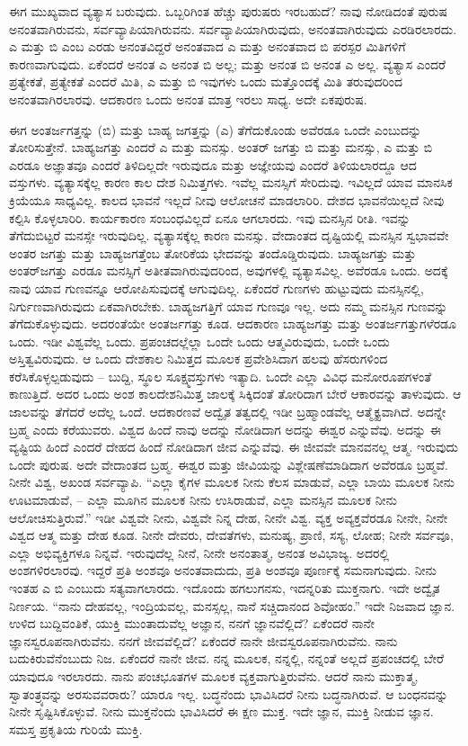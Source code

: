 ಈಗ ಮುಖ್ಯವಾದ ವ್ಯತ್ಯಾಸ ಬರುವುದು. ಒಬ್ಬರಿಗಿಂತ ಹೆಚ್ಚು ಪುರುಷರು ಇರಬಹುದೆ? ನಾವು ನೋಡಿದಂತೆ ಪುರುಷ ಅನಂತವಾಗಿರುವನು, ಸರ್ವವ್ಯಾಪಿಯಾಗಿರುವನು. ಸರ್ವವ್ಯಾಪಿಯಾಗಿರುವುದು, ಅನಂತವಾಗಿರುವುದು ಎರಡಿರಲಾರದು. ಎ ಮತ್ತು ಬಿ ಎಂಬ ಎರಡು ಅನಂತವಿದ್ದರೆ ಅನಂತವಾದ ಎ ಮತ್ತು ಅನಂತವಾದ ಬಿ ಪರಸ್ಪರ ಮಿತಿಗಳಿಗೆ ಕಾರಣವಾಗುವುದು. ಏಕೆಂದರೆ ಅನಂತ ಎ ಅನಂತ ಬಿ ಅಲ್ಲ; ಮತ್ತು ಅನಂತ ಬಿ ಅನಂತ ಎ ಅಲ್ಲ. ವ್ಯತ್ಯಾಸ ಎಂದರೆ ಪ್ರತ್ಯೇಕತೆ, ಪ್ರತ್ಯೇಕತೆ ಎಂದರೆ ಮಿತಿ, ಎ ಮತ್ತು ಬಿ ಇವುಗಳು ಒಂದು ಮತ್ತೊಂದಕ್ಕೆ ಮಿತಿ ತರುವುದರಿಂದ ಅನಂತವಾಗಿರಲಾರವು. ಆದಕಾರಣ ಒಂದು ಅನಂತ ಮಾತ್ರ ಇರಲು ಸಾಧ್ಯ. ಅದೇ ಏಕಪುರುಷ.

ಈಗ ಅಂತರ್ಜಗತ್ತನ್ನು (ಬಿ) ಮತ್ತು ಬಾಹ್ಯ ಜಗತ್ತನ್ನು (ಎ) ತೆಗೆದುಕೊಂಡು ಅವೆರಡೂ ಒಂದೇ ಎಂಬುದನ್ನು ತೋರಿಸುತ್ತೇನೆ. ಬಾಹ್ಯಜಗತ್ತು ಎಂದರೆ ಎ ಮತ್ತು ಮನಸ್ಸು. ಅಂತರ್‌ ಜಗತ್ತು ಬಿ ಮತ್ತು ಮನಸ್ಸು, ಎ ಮತ್ತು ಬಿ ಎರಡೂ ಅಜ್ಞಾತವೂ ಎಂದರೆ ತಿಳಿದಿಲ್ಲದೇ ಇರುವುದೂ ಮತ್ತು ಅಜ್ಞೇಯವು ಎಂದರೆ ತಿಳಿಯಲಾರದ್ದೂ ಆದ ವಸ್ತುಗಳು. ವ್ಯತ್ಯಾಸಕ್ಕೆಲ್ಲ ಕಾರಣ ಕಾಲ ದೇಶ ನಿಮಿತ್ತಗಳು. ಇವೆಲ್ಲ ಮನಸ್ಸಿಗೆ ಸೇರಿದುವು. ಇವಿಲ್ಲದೆ ಯಾವ ಮಾನಸಿಕ ಕ್ರಿಯೆಯೂ ಸಾಧ್ಯವಿಲ್ಲ. ಕಾಲದ ಭಾವನೆ ಇಲ್ಲದೆ ನೀವು ಆಲೋಚನೆ ಮಾಡಲಾರಿರಿ. ದೇಶದ ಭಾವನೆಯಿಲ್ಲದೆ ನೀವು ಕಲ್ಪಿಸಿ ಕೊಳ್ಳಲಾರಿರಿ. ಕಾರ್ಯಕಾರಣ ಸಂಬಂಧವಿಲ್ಲದೆ ಏನೂ ಆಗಲಾರದು. ಇವು ಮನಸ್ಸಿನ ರೀತಿ. ಇವನ್ನು ತೆಗೆದುಬಿಟ್ಟರೆ ಮನಸ್ಸೇ ಇರುವುದಿಲ್ಲ. ವ್ಯತ್ಯಾಸಕ್ಕೆಲ್ಲ ಕಾರಣ ಮನಸ್ಸು. ವೇದಾಂತದ ದೃಷ್ಟಿಯಲ್ಲಿ ಮನಸ್ಸಿನ ಸ್ವಭಾವವೇ ಅಂತರ ಜಗತ್ತು ಮತ್ತು ಬಾಹ್ಯಜಗತ್ತೆಂಬ ತೋರಿಕೆಯ ಭೇದವನ್ನು ತಂದೊಡ್ಡಿರುವುದು. ಬಾಹ್ಯಜಗತ್ತು ಮತ್ತು ಅಂತರ್‌ಜಗತ್ತು ಎರಡೂ ಮನಸ್ಸಿಗೆ ಅತೀತವಾಗಿರುವುದರಿಂದ, ಅವುಗಳಲ್ಲಿ ವ್ಯತ್ಯಾಸವಿಲ್ಲ. ಅವೆರಡೂ ಒಂದು. ಅದಕ್ಕೆ ನಾವು ಯಾವ ಗುಣವನ್ನೂ ಆರೋಪಿಸುವುದಕ್ಕೆ ಆಗುವುದಿಲ್ಲ. ಏಕೆಂದರೆ ಗುಣಗಳು ಹುಟ್ಟುವುದು ಮನಸ್ಸಿನಲ್ಲಿ, ನಿರ್ಗುಣವಾಗಿರುವುದು ಏಕವಾಗಿರಬೇಕು. ಬಾಹ್ಯಜಗತ್ತಿಗೆ ಯಾವ ಗುಣವೂ ಇಲ್ಲ. ಅದು ನಮ್ಮ ಮನಸ್ಸಿನ ಗುಣವನ್ನು ತೆಗೆದುಕೊಳ್ಳುವುದು. ಅದರಂತೆಯೇ ಅಂತರ್ಜಗತ್ತು ಕೂಡ. ಆದಕಾರಣ ಬಾಹ್ಯಜಗತ್ತು ಮತ್ತು ಅಂತರ್ಜಗತ್ತುಗಳೆರಡೂ ಒಂದು. ಇಡೀ ವಿಶ್ವವೆಲ್ಲ ಒಂದು. ಪ್ರಪಂಚದಲ್ಲೆಲ್ಲಾ ಒಂದೇ ಒಂದು ಆತ್ಮವಿರುವುದು, ಒಂದೇ ಒಂದು ಅಸ್ತಿತ್ವವಿರುವುದು. ಆ ಒಂದು ದೇಶಕಾಲ ನಿಮಿತ್ತದ ಮೂಲಕ ಪ್ರವೇಶಿಸಿದಾಗ ಹಲವು ಹೆಸರುಗಳಿಂದ ಕರೆಸಿಕೊಳ್ಳಲ್ಪಡುವುದು – ಬುದ್ದಿ, ಸ್ಥೂಲ ಸೂಕ್ಷ್ಮವಸ್ತುಗಳು ಇತ್ಯಾದಿ. ಒಂದೇ ಎಲ್ಲಾ ವಿವಿಧ ಮನೋರೂಪಗಳಂತೆ ಕಾಣುತ್ತಿದೆ. ಅದರ ಒಂದು ಅಂಶ ಕಾಲದೇಶನಿಮಿತ್ತ ಜಾಲಕ್ಕೆ ಸಿಕ್ಕಿದಂತೆ ತೋರಿದಾಗ ಬೇರೆ ಆಕಾರವನ್ನು ತಾಳುವುದು. ಆ ಜಾಲವನ್ನು ತೆಗೆದರೆ ಅದೆಲ್ಲ ಒಂದೆ. ಆದಕಾರಣವೆ ಅದ್ವೈತ ತತ್ವದಲ್ಲಿ ಇಡೀ ಬ್ರಹ್ಮಾಂಡವೆಲ್ಲ ಆತ್ಮೈಕ್ಯವಾಗಿದೆ. ಅದನ್ನೇ ಬ್ರಹ್ಮ ಎಂದು ಕರೆಯುವರು. ವಿಶ್ವದ ಹಿಂದೆ ನಾವು ಅದನ್ನು ನೋಡಿದಾಗ ಅದನ್ನು ಈಶ್ವರ ಎನ್ನುವೆವು. ಅದನ್ನು ಈ ವ್ಯಷ್ಟಿಯ ಹಿಂದೆ ಎಂದರೆ ದೇಹದ ಹಿಂದೆ ನೋಡಿದಾಗ ಜೀವ ಎನ್ನುವೆವು. ಈ ಜೀವವೇ ಮಾನವನಲ್ಲ ಆತ್ಮ. ಇರುವುದು ಒಂದೇ ಪುರುಷ. ಅದೇ ವೇದಾಂತದ ಬ್ರಹ್ಮ. ಈಶ್ವರ ಮತ್ತು ಜೀವಿಯನ್ನು ವಿಶ್ಲೇಷಣೆಮಾಡಿದಾಗ ಅವೆರಡೂ ಬ್ರಹ್ಮವೆ. ನೀನೇ ವಿಶ್ವ, ಅಖಂಡ ಸರ್ವವ್ಯಾಪಿ. “ಎಲ್ಲಾ ಕೈಗಳ ಮೂಲಕ ನೀನು ಕೆಲಸ ಮಾಡುವೆ, ಎಲ್ಲಾ ಬಾಯಿ ಮೂಲಕ ನೀನು ಊಟಮಾಡುವೆ, – ಎಲ್ಲಾ ಮೂಗಿನ ಮೂಲಕ ನೀನು ಉಸಿರಾಡುವೆ, ಎಲ್ಲಾ ಮನಸ್ಸಿನ ಮೂಲಕ ನೀನು ಆಲೋಚಿಸುತ್ತಿರುವೆ.'' ಇಡೀ ವಿಶ್ವವೇ ನೀನು, ವಿಶ್ವವೇ ನಿನ್ನ ದೇಹ, ನೀನೇ ವಿಶ್ವ. ವ್ಯಕ್ತ ಅವ್ಯಕ್ತವೆರಡೂ ನೀನೇ, ನೀನೇ ವಿಶ್ವದ ಆತ್ಮ ಮತ್ತು ದೇಹ ಕೂಡ. ನೀನೇ ದೇವರು, ದೇವತೆಗಳು, ಮನುಷ್ಯ, ಪ್ರಾಣಿ, ಸಸ್ಯ, ಲೋಹ; ನೀನೇ ಸರ್ವವೂ, ಎಲ್ಲಾ ಅಭಿವ್ಯಕ್ತಿಗಳೂ ನಿನ್ನವೆ. ಇರುವುದೆಲ್ಲ ನೀನೆ, ನೀನೇ ಅನಂತಾತ್ಮ, ಅನಂತ ಅವಿಭಾಜ್ಯ. ಅದರಲ್ಲಿ ಅಂಶಗಳಿರಲಾರವು. ಇದ್ದರೆ ಪ್ರತಿ ಅಂಶವೂ ಅನಂತವಾದುದು, ಪ್ರತಿ ಅಂಶವೂ ಪೂರ್ಣಕ್ಕೆ ಸಮನಾಗುವುದು. ನೀನು ಇಂತಹ ಎ ಬಿ ಎಂಬುದು ಸತ್ಯವಾಗಲಾರದು. ಇದೊಂದು ಹಗಲುಗನಸು, ಇದನ್ನರಿತು ಮುಕ್ತನಾಗು. ಇದೇ ಅದ್ವೈತ ನಿರ್ಣಯ. “ನಾನು ದೇಹವಲ್ಲ, ಇಂದ್ರಿಯವಲ್ಲ, ಮನಸ್ಸಲ್ಲ, ನಾನೆ ಸಚ್ಚಿದಾನಂದ ಶಿವೋಹಂ.'' ಇದೇ ನಿಜವಾದ ಜ್ಞಾನ. ಉಳಿದ ಬುದ್ದಿವಂತಿಕೆ, ಯುಕ್ತಿ ಮುಂತಾದುವೆಲ್ಲ ಅಜ್ಞಾನ, ನನಗೆ ಜ್ಞಾನವೆಲ್ಲಿದೆ? ಏಕೆಂದರೆ ನಾನೇ ಜ್ಞಾನಸ್ವರೂಪನಾಗಿರುವೆನು. ನನಗೆ ಜೀವವೆಲ್ಲಿದೆ? ಏಕೆಂದರೆ ನಾನೇ ಜೀವಸ್ವರೂಪನಾಗಿರುವೆನು. ನಾನು ಬದುಕಿರುವೆನೆಂಬುದು ನಿಜ. ಏಕೆಂದರೆ ನಾನೇ ಜೀವ. ನನ್ನ ಮೂಲಕ, ನನ್ನಲ್ಲಿ, ನನ್ನಂತೆ ಅಲ್ಲದೆ ಪ್ರಪಂಚದಲ್ಲಿ ಬೇರೆ ಯಾವುದೂ ಇರಲಾರದು. ನಾನು ಪಂಚಭೂತಗಳ ಮೂಲಕ ವ್ಯಕ್ತವಾಗುತ್ತಿರುವೆನು. ಆದರೆ ನಾನು ಮುಕ್ತಾತ್ಮ, ಸ್ವಾತಂತ್ರ್ಯವನ್ನು ಅರಸುವವರಾರು? ಯಾರೂ ಇಲ್ಲ. ಬದ್ಧನೆಂದು ಭಾವಿಸಿದರೆ ನೀನು ಬದ್ಧನಾಗಿರುವೆ. ಆ ಬಂಧನವನ್ನು ನೀನೇ ಸೃಷ್ಟಿಸಿಕೊಳ್ಳುವೆ. ನೀನು ಮುಕ್ತನೆಂದು ಭಾವಿಸಿದರೆ ಈ ಕ್ಷಣ ಮುಕ್ತ. ಇದೇ ಜ್ಞಾನ, ಮುಕ್ತಿ ನೀಡುವ ಜ್ಞಾನ. ಸಮಸ್ತ ಪ್ರಕೃತಿಯ ಗುರಿಯೆ ಮುಕ್ತಿ.

